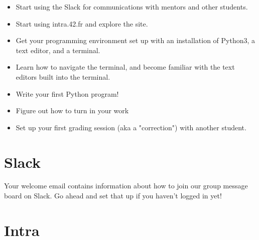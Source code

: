 \documentclass{42-en}
\begin{document}
\begin{itemize}

	\item Start using the Slack for communications with mentors and other students.

	\item Start using intra.42.fr and explore the site.

	\item Get your programming environment set up with an installation of Python3, a text editor, and a terminal.

	\item Learn how to navigate the terminal, and become familiar with the text editors built into the terminal.

	\item Write your first Python program!

	\item Figure out how to turn in your work

	\item Set up your first grading session (aka a "correction") with another student.

\end{itemize}


\chapter{Slack}

Your welcome email contains information about how to join our group message board
on Slack. Go ahead and set that up if you haven't logged in yet!


\chapter{Intra}
\end{document}
